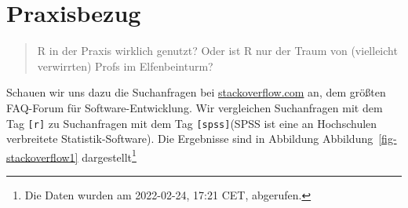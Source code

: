 \documentclass[
  letterpaper,
]{scrbook}
\theoremstyle{definition}
\theoremstyle{definition}
\theoremstyle{definition}
\theoremstyle{remark}
\begin{document}
\begin{table}

\caption{\label{tbl-lgl}Logische Prüfungen in R}


\end{table}%

\section{Praxisbezug}\label{praxisbezug-1}

\begin{quote}
{} R in der Praxis wirklich genutzt? Oder ist R nur der
Traum von (vielleicht verwirrten) Profs im Elfenbeinturm?
\end{quote}

Schauen wir uns dazu die Suchanfragen bei
\href{www.stackoverflow.com}{stackoverflow.com} an, dem größten
FAQ-Forum für Software-Entwicklung. Wir vergleichen Suchanfragen mit dem
Tag \texttt{{[}r{]}} zu Suchanfragen mit dem Tag
\texttt{{[}spss{]}}(SPSS ist eine an Hochschulen verbreitete
Statistik-Software). Die Ergebnisse sind in Abbildung
Abbildung~\ref{fig-stackoverflow1} dargestellt\footnote{Die Daten wurden
  am 2022-02-24, 17:21 CET, abgerufen.}
\end{document}
